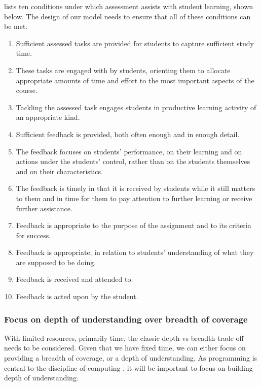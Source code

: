 \citet{Gibbs:2004} lists ten conditions under which assessment assists with student learning, shown below. The design of our model needs to ensure that all of these conditions can be met.
\begin{enumerate}
	\item Sufficient assessed tasks are provided for students to capture sufficient study time.
	\item These tasks are engaged with by students, orienting them to allocate appropriate amounts of time and effort to the most important aspects of the course.
	\item Tackling the assessed task engages students in productive learning activity of an appropriate kind.
	\item Sufficient feedback is provided, both often enough and in enough detail.
	\item The feedback focuses on students' performance, on their learning and on actions under the students' control, rather than on the students themselves and on their characteristics.
	\item The feedback is timely in that it is received by students while it still matters to them and in time for them to pay attention to further learning or receive further assistance.
	\item Feedback is appropriate to the purpose of the assignment and to its criteria for success.
	\item Feedback is appropriate, in relation to students' understanding of what they are supposed to be doing.
	\item Feedback is received and attended to.
	\item Feedback is acted upon by the student.
\end{enumerate}


\subsubsection{Focus on depth of understanding over breadth of coverage} %
\label{ssub:focus_on_depth_of_understanding_over_breadth_of_coverage_}

With limited resources, primarily time, the classic depth-vs-breadth trade off needs to be considered. Given that we have fixed time, we can either focus on providing a breadth of coverage, or a depth of understanding. 
As programming is central to the discipline of computing \cite{McGettrick:2005}, it will be important to focus on building depth of understanding.

